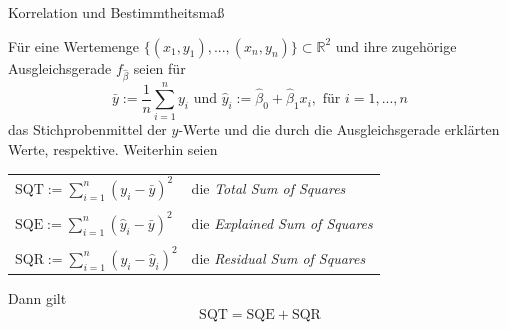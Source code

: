 \documentclass[
  8pt,
  ignorenonframetext,
]{beamer}
\begin{document}
\begin{frame}{Korrelation und Bestimmtheitsmaß}
\protect\hypertarget{korrelation-und-bestimmtheitsmauxdf-3}{}
\small
\begin{theorem}
\justifying
\normalfont
Für eine Wertemenge $\{(x_1,y_1), ..., (x_n,y_n)\} \subset \mathbb{R}^2$ und ihre
zugehörige Ausgleichsgerade $f_{\hat{\beta}}$ seien für
\begin{equation}
\bar{y} := \frac{1}{n}\sum_{i=1}^n y_i \mbox{ und }
\hat{y}_i := \hat{\beta}_0 + \hat{\beta}_1x_i, \mbox{ für } i= 1,...,n
\end{equation}
das Stichprobenmittel der $y$-Werte und die durch die Ausgleichsgerade erklärten Werte,
respektive. Weiterhin seien

\center
\vspace{1mm}
\begin{tabular}{ll}
$\mbox{SQT} := \sum_{i = 1}^n (y_i - \bar{y})^2$          & die \textit{Total Sum of Squares}      \\\\
$\mbox{SQE} := \sum_{i = 1}^n (\hat{y}_i - \bar{y})^2$    & die \textit{Explained Sum of Squares}  \\\\
$\mbox{SQR} := \sum_{i = 1}^n (y_i - \hat{y}_i)^2$        & die \textit{Residual Sum of Squares}   \\
\end{tabular}
\vspace{1mm}
\flushleft
Dann gilt
\begin{equation}
\mbox{SQT} = \mbox{SQE} + \mbox{SQR}
\end{equation}
\end{theorem}
\end{frame}
\end{document}
